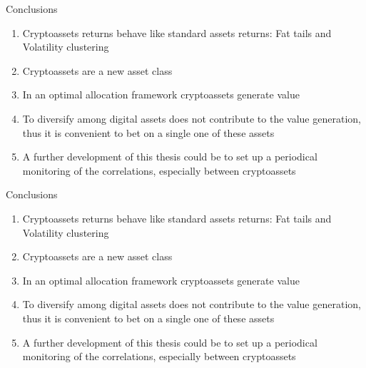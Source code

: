\documentclass[aspectratio=169]{beamer}
\begin{document}
\begin{frame}{Conclusions}
	\begin{enumerate}
		\item Cryptoassets returns behave like standard assets returns: Fat tails and Volatility clustering 
		\bigskip
			
		\item Cryptoassets are a new asset class
		\bigskip
		
		\item In an optimal allocation framework cryptoassets generate value
		\bigskip
		
		\item To diversify among digital assets does not contribute to the value generation, thus it is convenient to bet on a single one of these assets
		\bigskip
		
		\item A further development of this thesis could be to set up a periodical monitoring of the correlations, especially between cryptoassets
	\end{enumerate}	
\end{frame}


{
	\begin{frame}[noframenumbering]{Conclusions}
	\begin{enumerate}
		\item Cryptoassets returns behave like standard assets returns: Fat tails and Volatility clustering 
		\bigskip
			
		\item Cryptoassets are a new asset class
		\bigskip
		
		\item In an optimal allocation framework cryptoassets generate value
		\bigskip
		
		\item To diversify among digital assets does not contribute to the value generation, thus it is convenient to bet on a single one of these assets
		\bigskip
		
		\item A further development of this thesis could be to set up a periodical monitoring of the correlations, especially between cryptoassets
	\end{enumerate}	
    \end{frame}
}
\end{document}

